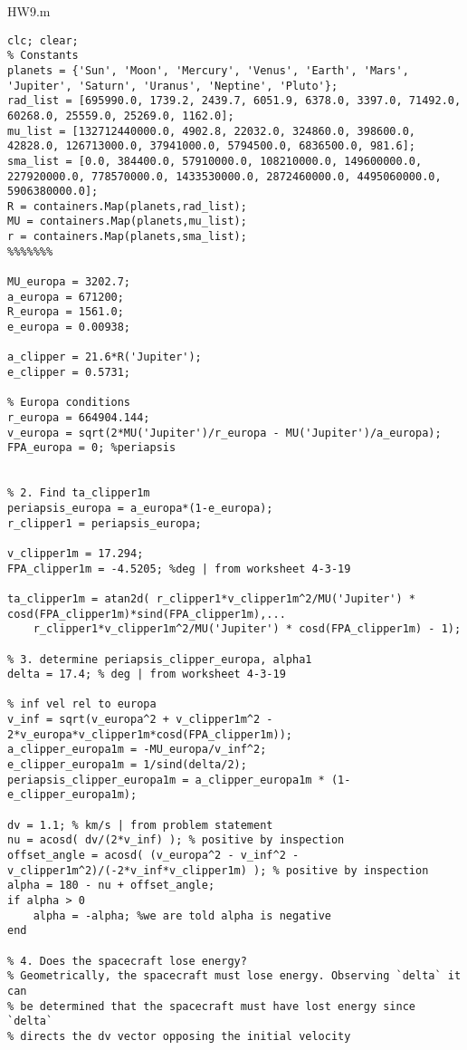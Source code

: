 HW9.m
\begin{lstlisting}[frame=lines,style=Matlab-editor,basicstyle = \mlttfamily]
clc; clear;
% Constants
planets = {'Sun', 'Moon', 'Mercury', 'Venus', 'Earth', 'Mars', 'Jupiter', 'Saturn', 'Uranus', 'Neptine', 'Pluto'};
rad_list = [695990.0, 1739.2, 2439.7, 6051.9, 6378.0, 3397.0, 71492.0, 60268.0, 25559.0, 25269.0, 1162.0];
mu_list = [132712440000.0, 4902.8, 22032.0, 324860.0, 398600.0, 42828.0, 126713000.0, 37941000.0, 5794500.0, 6836500.0, 981.6];
sma_list = [0.0, 384400.0, 57910000.0, 108210000.0, 149600000.0, 227920000.0, 778570000.0, 1433530000.0, 2872460000.0, 4495060000.0, 5906380000.0];
R = containers.Map(planets,rad_list);
MU = containers.Map(planets,mu_list);
r = containers.Map(planets,sma_list);
%%%%%%%

MU_europa = 3202.7;
a_europa = 671200;
R_europa = 1561.0;
e_europa = 0.00938;

a_clipper = 21.6*R('Jupiter');
e_clipper = 0.5731;

% Europa conditions
r_europa = 664904.144;
v_europa = sqrt(2*MU('Jupiter')/r_europa - MU('Jupiter')/a_europa);
FPA_europa = 0; %periapsis


% 2. Find ta_clipper1m
periapsis_europa = a_europa*(1-e_europa);
r_clipper1 = periapsis_europa;

v_clipper1m = 17.294;
FPA_clipper1m = -4.5205; %deg | from worksheet 4-3-19

ta_clipper1m = atan2d( r_clipper1*v_clipper1m^2/MU('Jupiter') * cosd(FPA_clipper1m)*sind(FPA_clipper1m),...
    r_clipper1*v_clipper1m^2/MU('Jupiter') * cosd(FPA_clipper1m) - 1);

% 3. determine periapsis_clipper_europa, alpha1
delta = 17.4; % deg | from worksheet 4-3-19

% inf vel rel to europa
v_inf = sqrt(v_europa^2 + v_clipper1m^2 - 2*v_europa*v_clipper1m*cosd(FPA_clipper1m));
a_clipper_europa1m = -MU_europa/v_inf^2;
e_clipper_europa1m = 1/sind(delta/2);
periapsis_clipper_europa1m = a_clipper_europa1m * (1-e_clipper_europa1m);

dv = 1.1; % km/s | from problem statement
nu = acosd( dv/(2*v_inf) ); % positive by inspection
offset_angle = acosd( (v_europa^2 - v_inf^2 - v_clipper1m^2)/(-2*v_inf*v_clipper1m) ); % positive by inspection
alpha = 180 - nu + offset_angle;
if alpha > 0
    alpha = -alpha; %we are told alpha is negative
end

% 4. Does the spacecraft lose energy?
% Geometrically, the spacecraft must lose energy. Observing `delta` it can
% be determined that the spacecraft must have lost energy since `delta`
% directs the dv vector opposing the initial velocity


\end{lstlisting}
